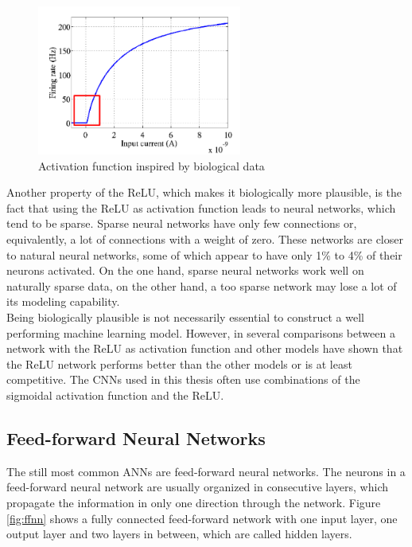 \documentclass[11pt, a4paper]{article}
\begin{document}
\begin{figure}[htbp]
	\centering
	\includegraphics[width=0.6\textwidth]{biological_activation_function.png}
	\caption[Activation function inspired by biological data]{Activation function inspired by biological data\footnotemark}
	\label{fig:biological_activation_function}
\end{figure}


Another property of the \ac{ReLU}, which makes it biologically more plausible, is the fact that using the \ac{ReLU} as activation function leads to neural networks, which tend to be sparse. Sparse neural networks have only few connections or, equivalently, a lot of connections with a weight of zero. These networks are closer to natural neural networks, some of which appear to have only 1\% to 4\% of their neurons activated. On the one hand, sparse neural networks work well on naturally sparse data, on the other hand, a too sparse network may lose a lot of its modeling capability.\\
Being biologically plausible is not necessarily essential to construct a well performing machine learning model. However, in \cite{dsrnn} several comparisons between a network with the \ac{ReLU} as activation function and other models have shown that the \ac{ReLU} network performs better than the other models or is at least competitive. The \acp{CNN} used in this thesis often use combinations of the sigmoidal activation function and the \ac{ReLU}.

\subsection{Feed-forward Neural Networks}

The still most common \acp{ANN} are feed-forward neural networks. The neurons in a feed-forward neural network are usually organized in consecutive layers, which propagate the information in only one direction through the network. Figure \ref{fig:ffnn} shows a fully connected feed-forward network with one input layer, one output layer and two layers in between, which are called hidden layers.

\end{document}
